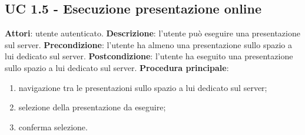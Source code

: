 \subsection{UC 1.5 - Esecuzione presentazione online}{
\textbf{Attori}: utente autenticato.
	\textbf{Descrizione}: l'utente può eseguire una presentazione sul server.
	\textbf{Precondizione}: l'utente ha almeno una presentazione sullo spazio a lui dedicato sul server.
	\textbf{Postcondizione}: l'utente ha eseguito una presentazione sullo spazio a lui dedicato sul server.
	\textbf{Procedura principale}:
	\begin{enumerate}
		\item navigazione tra le presentazioni sullo spazio a lui dedicato sul server;
		\item selezione della presentazione da eseguire;
		\item conferma selezione.
	\end{enumerate}
}